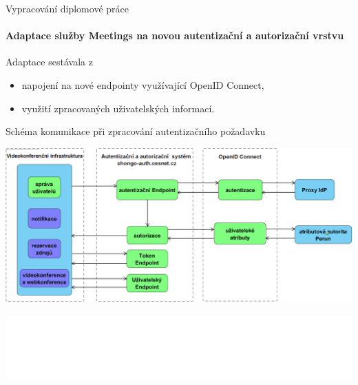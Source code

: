 \documentclass[
]{beamer}
\begin{document}
\begin{frame}{Vypracování diplomové práce}
\framesubtitle{Adaptace služby Meetings na novou autentizační a autorizační vrstvu}
Adaptace sestávala z 

\begin{itemize}
    \item napojení na nové endpointy využívající OpenID Connect,
    \item využití zpracovaných uživatelských informací.
\end{itemize}

\end{frame}




\begin{frame}{Schéma komunikace při zpracování autentizačního požadavku}

\includegraphics[width=\textwidth]{pics/oidc-new.png}
\end{frame}


\begingroup
{}
\begin{frame}[plain]
\vfill
\centering
\includegraphics[width=\textwidth]{institution}
\vfill
\end{frame}
\endgroup
\end{document}
